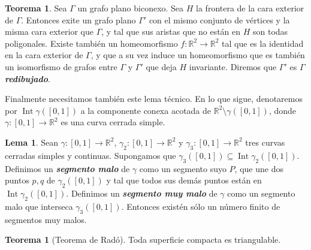 \documentclass[10pt]{report}
\newcommand{\R}{\mathbb{R}}
\DeclareMathOperator{\interior}{Int} %
\newcommand{\enfatiza}[1]{\textbf{\textit{#1}}}
\theoremstyle{definition}
\newtheorem{tma}[defin]{Teorema}
\newtheorem{lema}[defin]{Lema}
\begin{document}
\begin{tma}\label{tma:grafos}
Sea $\Gamma$ un grafo plano biconexo. Sea $H$ la frontera de la cara exterior de $\Gamma$. Entonces exite un grafo plano $\Gamma'$ con el mismo conjunto de vértices y la misma cara exterior que $\Gamma$, y tal que sus aristas que no están en $H$ son todas poligonales. Existe también un homeomorfismo $f:\R^2 \to \R^2$ tal que es la identidad en la cara exterior de $\Gamma$, y que a su vez induce un homeomorfismo que es también un isomorfismo de grafos entre $\Gamma$ y $\Gamma'$ que deja $H$ invariante. Diremos que $\Gamma'$ es $\Gamma$ \enfatiza{redibujado}.
\end{tma}

Finalmente necesitamos también este lema técnico. En lo que sigue, denotaremos por $\interior{\gamma ([0,1])}$ a la componente conexa acotada de $\R^2 \setminus \gamma ([0,1])$, donde $\gamma :[0,1] \to \R^2$ es una curva cerrada simple. 

\begin{lema}\label{lema:malo}
Sean $\gamma :[0,1] \to \R^2$, $\gamma_2 : [0,1] \to \R^2$ y $\gamma_3 :[0,1] \to \R^2$ tres curvas cerradas simples y continuas. Supongamos que $\gamma_3 ([0,1]) \subseteq \interior{\gamma_2 ([0,1])} $. Definimos un \enfatiza{segmento malo} de $\gamma$ como un segmento suyo $P$, que une dos puntos $p,q$ de $\gamma_2 ([0,1])$ y tal que todos sus demás puntos están en $\interior{\gamma_2 ([0,1])}$. Definimos un \enfatiza{segmento muy malo} de $\gamma$ como un segmento malo que interseca $\gamma_3 ([0,1])$. Entonces existén sólo un número finito de segmentos muy malos. 
\end{lema}



\begin{tma}[Teorema de Radó]
Toda superficie compacta es triangulable. \label{teo:rado}
\end{tma}
\end{document}
